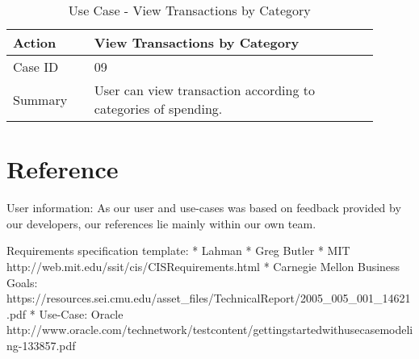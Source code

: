 \documentclass[11pt]{article}
\newcounter{use case ID}
\newcommand\tabularhead[1]{
\begin{table}[ht]
    \addtocounter{use case ID}{1}
    \caption{Use Case \arabic{use case ID} - #1}
    \vspace{0.2cm}
    \begin{tabular}{|p{0.2\linewidth}|p{0.70\linewidth}|}
    \hline
        \textbf{Action} & \textbf{#1} \\
        \hline}
\newcommand\addrow[2]{#1 & #2\\ \hline}
\newcommand\addmulrow[2]{ \begin{minipage}[t][][t]{2.5cm}#1\end{minipage}
        &\begin{minipage}[t][][t]{11cm}
        \begin{enumerate}[itemsep=-1ex] #2   \end{enumerate}
    \end{minipage}\vfill\\ \hline}
\newenvironment{usecase}{\tabularhead}
{\hline\end{tabular}\end{table}}
\begin{document}
\begin{usecase}{View Transactions by Category}
    \addrow{Case ID}{09}
    \addrow{Summary}{User can view transaction according to categories of spending.}
\end{usecase}

\section{Reference}
User information: As our user and use-cases was based on feedback provided by our developers, our references lie mainly within our own team.

Requirements specification template:\newline
* Lahman \newline
* Greg Butler\newline
* MIT http://web.mit.edu/ssit/cis/CISRequirements.html\newline
* Carnegie Mellon Business Goals: https://resources.sei.cmu.edu/asset\_files/TechnicalReport/2005\_005\_001\_14621.pdf\newline
* Use-Case: Oracle http://www.oracle.com/technetwork/testcontent/gettingstartedwithusecasemodeling-133857.pdf
\end{document}
